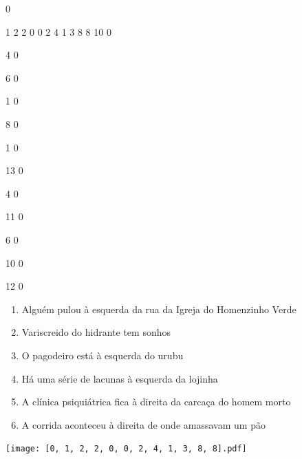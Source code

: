 \documentclass[12pt]{article}
\begin{document}
		\vfill  
		  
{
	0	%

	1	%
	2	%
	2	%
	0	%
	0	%
	2	%
	4	%
	1	%
	3	%
	8	%
	8	%
	10	%
	0	%

	4	%
	0	%

	6	%
	0	%

	1	%
	0	%

	8	%
	0	%

	1	%
	0	%

	13	%
	0	%

	4	%
	0	%

	11	%
	0	%

	6	%
	0	%

	10	%
	0	%

	12	%
	0	%

}	  
		    	

		 

\pagebreak


	\begin{enumerate}
		  \sffamily %
		  \large %


\vfill \item
Alguém pulou	%
à esquerda
da rua da Igreja do Homenzinho Verde	%

\vfill \item
Variscreido do hidrante	%
tem sonhos	%

\vfill \item
O pagodeiro está	%
à esquerda
do urubu	%

\vfill \item
Há uma série de lacunas	%
à esquerda
da lojinha	%

\vfill \item
A clínica psiquiátrica fica	%
à direita
da carcaça do homem morto	%

\vfill \item
A corrida aconteceu	%
à direita
de onde amassavam um pão	%
	\end{enumerate}
		  
		  \hfill

		  \vfill

\texttt{[image: [0, 1, 2, 2, 0, 0, 2, 4, 1, 3, 8, 8].pdf]}
\end{document}

